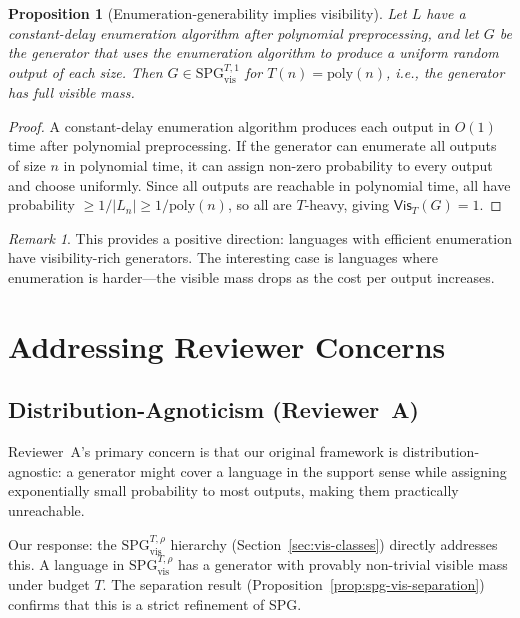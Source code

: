 \documentclass[11pt]{article}
\newcommand{\SPGvis}[2]{\mathrm{SPG}_{\mathrm{vis}}^{#1,#2}}
\newtheorem{proposition}[definition]{Proposition}
\theoremstyle{remark}
\newtheorem{remark}[definition]{Remark}
\theoremstyle{definition}
\begin{document}
\begin{proposition}[Enumeration-generability implies visibility]
Let $L$ have a constant-delay enumeration algorithm after polynomial
preprocessing, and let $G$ be the generator that uses the enumeration
algorithm to produce a uniform random output of each size.  Then
$G \in \SPGvis{T}{1}$ for $T(n) = \mathrm{poly}(n)$, i.e., the generator
has full visible mass.
\end{proposition}

\begin{proof}
A constant-delay enumeration algorithm produces each output in $O(1)$ time
after polynomial preprocessing.  If the generator can enumerate all outputs
of size $n$ in polynomial time, it can assign non-zero probability to every
output and choose uniformly.  Since all outputs are reachable in polynomial
time, all have probability $\ge 1/|L_n| \ge 1/\mathrm{poly}(n)$, so all are
$T$-heavy, giving $\mathsf{Vis}_T(G) = 1$.
\end{proof}

\begin{remark}
This provides a positive direction: languages with efficient enumeration
have visibility-rich generators.  The interesting case is languages where
enumeration is harder---the visible mass drops as the cost per output
increases.
\end{remark}


\section{Addressing Reviewer Concerns}\label{sec:reviewer-response}

\subsection{Distribution-Agnoticism (Reviewer~A)}

Reviewer~A's primary concern is that our original framework is
distribution-agnostic: a generator might cover a language in the support sense
while assigning exponentially small probability to most outputs, making them
practically unreachable.

Our response: the $\SPGvis{T}{\rho}$ hierarchy (Section~\ref{sec:vis-classes})
directly addresses this.  A language in $\SPGvis{T}{\rho}$ has a generator
with provably non-trivial visible mass under budget $T$.  The separation
result (Proposition~\ref{prop:spg-vis-separation}) confirms that this is a
strict refinement of SPG.
\end{document}
